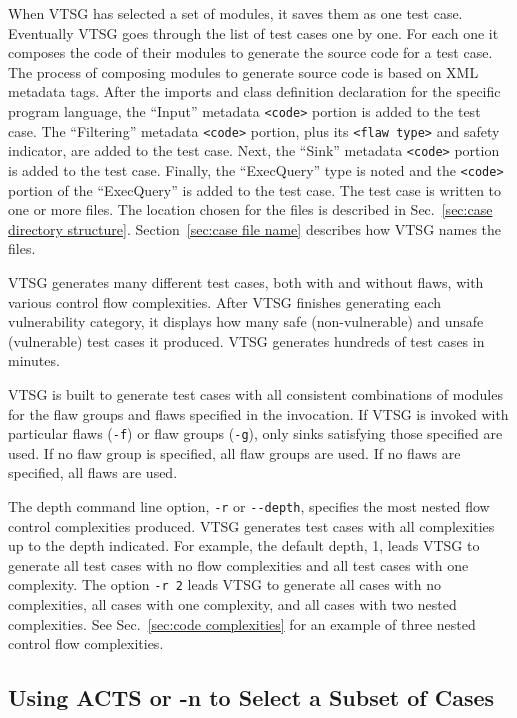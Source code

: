 \documentclass[12pt]{article}
\begin{document}
When VTSG has selected a set of modules, it saves them as one test case.
Eventually VTSG goes through the list of test cases one by one.  For each one it
composes the code of their modules to generate the source code for a test case.
The process of composing modules to generate source code is
based on XML metadata tags.
After the imports and class definition declaration for the 
specific program
language, the ``Input'' metadata \verb|<code>| portion
is added to the test case.  
The ``Filtering'' metadata \verb|<code>| portion, plus its
\verb|<flaw type>| and safety indicator, are added to
the test case.  Next, the ``Sink'' metadata 
\verb|<code>| portion
is added to the test case.  Finally, the ``ExecQuery'' type is 
noted and the 
\verb|<code>| portion of the ``ExecQuery'' is added
to the 
test case.  The test case is written to one or more files.
The location chosen for the files is
described in Sec.~\ref{sec:case directory structure}.
Section~\ref{sec:case file name} describes how VTSG names the files.

VTSG generates many different test cases, both with and without
flaws, with various control flow complexities.  After VTSG finishes
generating each vulnerability category, it displays how many safe (non-vulnerable)
and unsafe (vulnerable) test cases it produced.
VTSG generates hundreds of test cases in minutes.

VTSG is built to generate test cases with all consistent combinations
of modules for the flaw groups and flaws specified in the invocation.
If VTSG is invoked with particular flaws (\verb|-f|) or flaw groups (\verb|-g|),
only sinks satisfying those specified are used.
If no flaw group is specified, all flaw groups are used.  
If no flaws are specified, all flaws are used.

\label{sec:depth of complexities}
The depth command line option, \verb|-r| or \verb|--depth|, 
specifies the
most nested flow control complexities produced.
VTSG generates test cases with all complexities up to the depth
indicated.
For example, the default depth, 1, leads VTSG to generate all
test cases with no flow complexities and all test cases with 
one complexity.  The option \verb|-r 2| leads VTSG to generate
all cases with no complexities, all cases with one complexity, 
and all cases with two nested complexities.
See Sec.~\ref{sec:code complexities} for an example of three 
nested control flow complexities.

\subsection{Using ACTS or -n to Select a Subset of Cases}
\label{sec:selecting cases}
\end{document}
